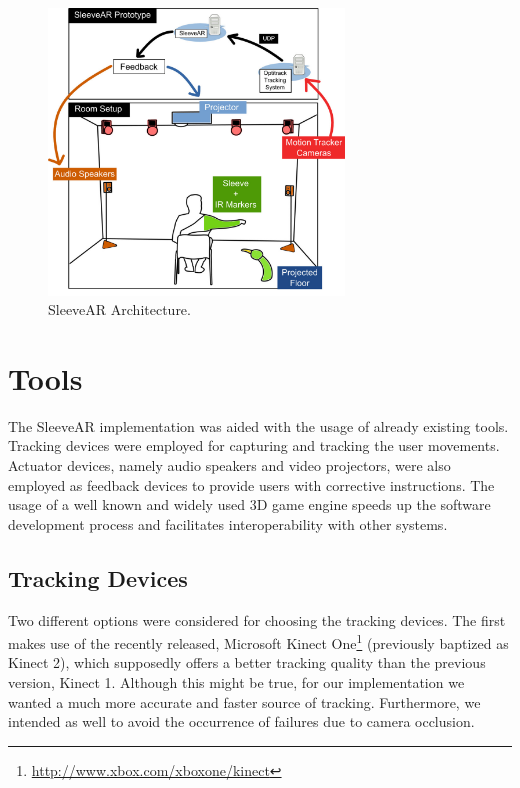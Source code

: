 \begin{figure}[!t]
    \begin{center}
        \includegraphics[width=0.7\textwidth]{imgs/impl/arch}
    \end{center}
    \caption{SleeveAR Architecture.}
    \label{fig:arch}
\end{figure}




\section{Tools}
\label{sec:impl:tools}

The SleeveAR implementation was aided with the usage of already existing tools. Tracking devices were employed for capturing and tracking the user movements. Actuator devices, namely audio speakers and video projectors, were also employed as feedback devices to provide users with corrective instructions. The usage of a well known and widely used 3D game engine speeds up the software development process and facilitates interoperability with other systems.

\subsection{Tracking Devices}
\label{sec:impl:trackdevices}

Two different options were considered for choosing the tracking devices.
The first makes use of the recently released, Microsoft Kinect One\footnote{\url{http://www.xbox.com/xboxone/kinect}} 
(previously baptized as Kinect 2), which supposedly offers a better tracking quality than 
the previous version, Kinect 1. Although this might be true, for our implementation we wanted a much more accurate and faster source of tracking. Furthermore, we intended as well to avoid the occurrence of failures due to camera occlusion.

